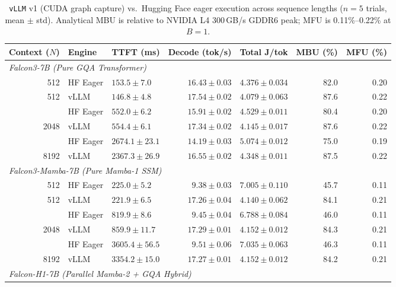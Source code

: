 \documentclass[10pt,a4paper]{article}
\begin{document}
\begin{table}[ht!]
\centering
\footnotesize
\setlength{\tabcolsep}{6.5pt}
\caption{\texttt{vLLM} v1 (CUDA graph capture) vs.\ Hugging Face eager execution across sequence lengths ($n=5$ trials, mean $\pm$ std). Analytical MBU is relative to NVIDIA L4 300\,GB/s GDDR6 peak; MFU is 0.11\%--0.22\% at $B=1$.}
\label{tab:vllm}
\begin{tabular}{rllrrrr}
\toprule
\textbf{Context ($N$)} & \textbf{Engine} & \textbf{TTFT (ms)} & \textbf{Decode (tok/s)} & \textbf{Total J/tok} & \textbf{MBU (\%)} & \textbf{MFU (\%)} \\
\midrule
\multicolumn{7}{l}{\textit{Falcon3-7B (Pure GQA Transformer)}} \\
512  & HF Eager & $153.5 \pm 7.0$ & $16.43 \pm 0.03$ & $4.376 \pm 0.034$ & 82.0 & 0.20 \\
512  & vLLM     & $146.8 \pm 4.8$ & $17.54 \pm 0.02$ & $4.079 \pm 0.063$ & 87.6 & 0.22 \\
\addlinespace[2.5pt]
2048 & HF Eager & $552.0 \pm 6.2$ & $15.91 \pm 0.02$ & $4.529 \pm 0.011$ & 80.4 & 0.20 \\
2048 & vLLM     & $554.4 \pm 6.1$ & $17.34 \pm 0.02$ & $4.145 \pm 0.017$ & 87.6 & 0.22 \\
\addlinespace[2.5pt]
8192 & HF Eager & $2674.1 \pm 23.1$ & $14.19 \pm 0.03$ & $5.074 \pm 0.012$ & 75.0 & 0.19 \\
8192 & vLLM     & $2367.3 \pm 26.9$ & $16.55 \pm 0.02$ & $4.348 \pm 0.011$ & 87.5 & 0.22 \\
\midrule
\multicolumn{7}{l}{\textit{Falcon3-Mamba-7B (Pure Mamba-1 SSM)}} \\
512  & HF Eager & $225.0 \pm 5.2$ & $9.38 \pm 0.03$ & $7.005 \pm 0.110$ & 45.7 & 0.11 \\
512  & vLLM     & $221.9 \pm 6.5$ & $17.26 \pm 0.04$ & $4.140 \pm 0.062$ & 84.1 & 0.21 \\
\addlinespace[2.5pt]
2048 & HF Eager & $819.9 \pm 8.6$ & $9.45 \pm 0.04$ & $6.788 \pm 0.084$ & 46.0 & 0.11 \\
2048 & vLLM     & $859.9 \pm 11.7$ & $17.29 \pm 0.01$ & $4.152 \pm 0.012$ & 84.3 & 0.21 \\
\addlinespace[2.5pt]
8192 & HF Eager & $3605.4 \pm 56.5$ & $9.51 \pm 0.06$ & $7.035 \pm 0.063$ & 46.3 & 0.11 \\
8192 & vLLM     & $3354.2 \pm 15.0$ & $17.27 \pm 0.01$ & $4.152 \pm 0.012$ & 84.2 & 0.21 \\
\midrule
\multicolumn{7}{l}{\textit{Falcon-H1-7B (Parallel Mamba-2 + GQA Hybrid)}} \\

\end{tabular}
\end{table}
\end{document}
